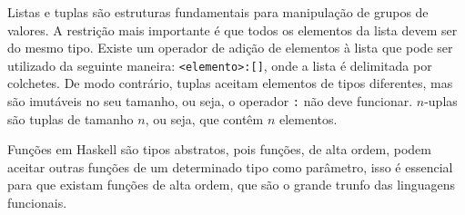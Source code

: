 \documentclass[a4paper,twocolumn,10pt]{article}
\begin{document}
Listas e tuplas são estruturas fundamentais para manipulação de grupos de
valores. A restrição mais importante é que todos os elementos da lista devem
ser do mesmo tipo. Existe um operador de adição de elementos à lista que pode
ser utilizado da seguinte maneira: \texttt{<elemento>:[]}, onde a lista é
delimitada por colchetes. De modo contrário, tuplas aceitam elementos de tipos
diferentes, mas são imutáveis no seu tamanho, ou seja, o operador \texttt{:}
não deve funcionar. $n$-uplas são tuplas de tamanho $n$, ou seja, que contêm
$n$ elementos.

Funções em Haskell são tipos abstratos, pois funções, de alta ordem, podem
aceitar outras funções de um determinado tipo como parâmetro, isso é essencial
para que existam funções de alta ordem, que são o grande trunfo das linguagens
funcionais.
\end{document}
